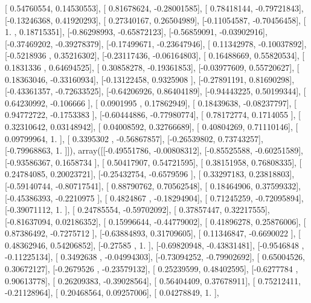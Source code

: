\documentclass{article}
\begin{document}
       [ 0.54760554,  0.14530553],
       [ 0.81678624, -0.28001585],
       [ 0.78418144, -0.79721843],
       [-0.13246368,  0.41920293],
       [ 0.27340167,  0.26504989],
       [-0.11054587, -0.70456458],
       [ 1.        ,  0.18715351],
       [-0.86298993, -0.65872123],
       [-0.56859091, -0.03902916],
       [-0.37469202, -0.39278379],
       [-0.17499671, -0.23647946],
       [ 0.11342978, -0.10037892],
       [-0.5218936 ,  0.35216302],
       [-0.23117436, -0.06164803],
       [ 0.16488669,  0.55820534],
       [ 0.1831336 ,  0.64694525],
       [ 0.30858278, -0.19361853],
       [-0.03977609,  0.55720627],
       [ 0.18363046, -0.33160934],
       [-0.13122458,  0.9325908 ],
       [-0.27891191,  0.81690298],
       [-0.43361357, -0.72633525],
       [-0.64206926,  0.86404189],
       [-0.94443225,  0.50199344],
       [ 0.64230992, -0.106666  ],
       [ 0.0901995 ,  0.17862949],
       [ 0.18439638, -0.08237797],
       [ 0.94772722, -0.1753383 ],
       [-0.60444886, -0.77980774],
       [ 0.78172774,  0.1714055 ],
       [ 0.32310642,  0.03148942],
       [ 0.04008592,  0.32766689],
       [ 0.40804269,  0.71110146],
       [ 0.09799964,  1.        ],
       [ 0.3395302 , -0.56867857],
       [-0.26539802,  0.73743257],
       [-0.79968863,  1.        ]]), array([[-0.49551786, -0.00808312],
       [-0.85525588, -0.60251589],
       [-0.93586367,  0.1658734 ],
       [ 0.50417907,  0.54721595],
       [ 0.38151958,  0.76808335],
       [ 0.24784085,  0.20023721],
       [-0.25432754, -0.6579596 ],
       [ 0.33297183,  0.23818803],
       [-0.59140744, -0.80717541],
       [ 0.88790762,  0.70562548],
       [ 0.18464906,  0.37599332],
       [-0.45386393, -0.2210975 ],
       [ 0.4824867 , -0.18294904],
       [ 0.71245259, -0.72095894],
       [-0.39071112,  1.        ],
       [ 0.24785554, -0.59702092],
       [ 0.37857447,  0.32217555],
       [-0.81637094,  0.02186352],
       [ 0.15996644, -0.44779002],
       [ 0.41896278,  0.25876006],
       [ 0.87386492, -0.7275712 ],
       [-0.63884893,  0.31709605],
       [ 0.11346847, -0.6690022 ],
       [ 0.48362946,  0.54206852],
       [-0.27585   ,  1.        ],
       [-0.69820948, -0.43831481],
       [-0.9546848 , -0.11225134],
       [ 0.3492638 , -0.04994303],
       [-0.73094252, -0.79902692],
       [ 0.65004526,  0.30672127],
       [-0.2679526 , -0.23579132],
       [ 0.25239599,  0.48402595],
       [-0.6277784 ,  0.90613778],
       [ 0.26209383, -0.39028564],
       [ 0.56404409,  0.37678911],
       [ 0.75212411, -0.21128964],
       [ 0.20468564,  0.09257006],
       [ 0.04278849,  1.        ],
\end{document}
